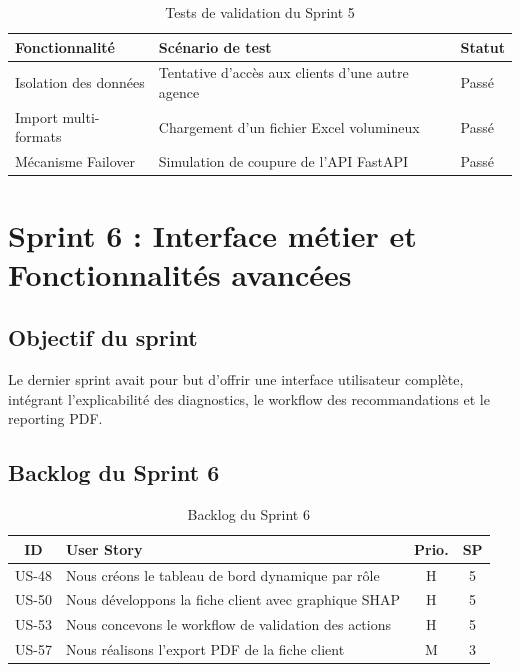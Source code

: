 \begin{table}[htbp]
    \small
    \centering
    \begin{tabular}{|p{4cm}|p{5cm}|p{2cm}|}
        \hline
        Fonctionnalité & Scénario de test & Statut \\
        \hline
        Isolation des données & Tentative d'accès aux clients d'une autre agence & Passé \\
        \hline
        Import multi-formats & Chargement d'un fichier Excel volumineux & Passé \\
        \hline
        Mécanisme Failover & Simulation de coupure de l'API FastAPI & Passé \\
        \hline
    \end{tabular}
    \caption{Tests de validation du Sprint 5}
\end{table}

\section{Sprint 6 : Interface métier et Fonctionnalités avancées}

\subsection{Objectif du sprint}

Le dernier sprint avait pour but d'offrir une interface utilisateur complète, intégrant l'explicabilité des diagnostics, le workflow des recommandations et le reporting PDF.

\subsection{Backlog du Sprint 6}

\begin{table}[htbp]
\centering
\caption{Backlog du Sprint 6}
\label{tab:sprint6}
\small
\begin{tabular}{|c|p{8.5cm}|c|c|}
\hline
\textbf{ID} & \textbf{User Story} & \textbf{Prio.} & \textbf{SP} \\
\hline
US-48 & Nous créons le tableau de bord dynamique par rôle & H & 5 \\
\hline
US-50 & Nous développons la fiche client avec graphique SHAP & H & 5 \\
\hline
US-53 & Nous concevons le workflow de validation des actions & H & 5 \\
\hline
US-57 & Nous réalisons l'export PDF de la fiche client & M & 3 \\
\hline
\end{tabular}
\end{table}

